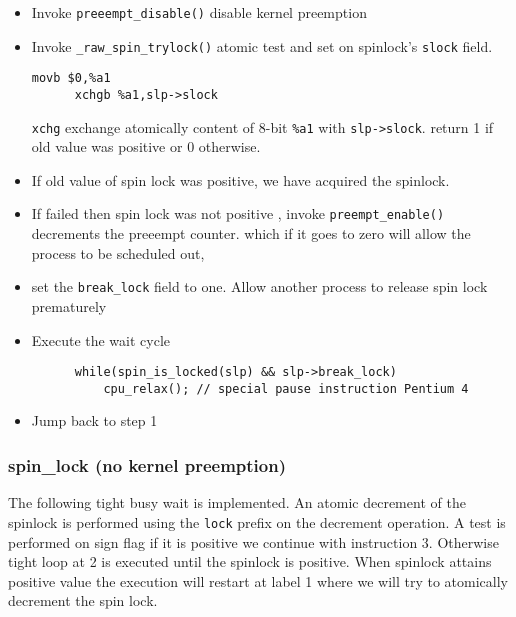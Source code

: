 \documentclass{article}
\begin{document}
  \begin{itemize}
  \item Invoke \lstinline{preeempt_disable()} disable kernel preemption
    
  \item Invoke \lstinline{_raw_spin_trylock()} atomic test and set on
    spinlock's \lstinline{slock} field.

      \begin{lstlisting}[language=anX86]
      movb $0,%a1
      xchgb %a1,slp->slock
      \end{lstlisting}


      \lstinline{xchg} exchange atomically content of 8-bit
      \lstinline{%a1} with \lstinline{slp->slock}.  return 1 if old
      value was positive or 0 otherwise.

    \item If old value of spin lock was positive, we have acquired the
      spinlock.
        
    \item If failed then spin lock was not positive , invoke
      \lstinline{preempt_enable()} decrements the preeempt counter. which
      if it goes to zero will allow the process to be scheduled out,

    \item set the \lstinline{break_lock} field to one. Allow another
      process to release spin lock prematurely

    \item Execute the wait cycle
      \begin{lstlisting}
      while(spin_is_locked(slp) && slp->break_lock)
          cpu_relax(); // special pause instruction Pentium 4
      \end{lstlisting}
    \item Jump back to step 1       
  \end{itemize}


  \subsubsection{spin\_lock (no kernel preemption)}

  The following tight busy wait is implemented. An atomic decrement of
  the spinlock is performed using the \lstinline{lock} prefix on the
  decrement operation. A test is performed on sign flag if it is
  positive we continue with instruction 3. Otherwise tight loop at 2
  is executed until the spinlock is positive. When spinlock attains
  positive value the execution will restart at label 1 where we will
  try to atomically decrement the spin lock.
\end{document}
